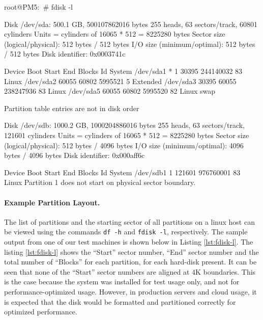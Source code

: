 \begin{snippet}
root@PM5:~# fdisk -l

Disk /dev/sda: 500.1 GB, 500107862016 bytes
255 heads, 63 sectors/track, 60801 cylinders
Units = cylinders of 16065 * 512 = 8225280 bytes
Sector size (logical/physical): 512 bytes / 512 bytes
I/O size (minimum/optimal): 512 bytes / 512 bytes
Disk identifier: 0x0003741c

   Device Boot      Start         End      Blocks   Id  System
/dev/sda1   *           1       30395   244140032   83  Linux
/dev/sda2           60055       60802     5995521    5  Extended
/dev/sda3           30395       60055   238247936   83  Linux
/dev/sda5           60055       60802     5995520   82  Linux swap

Partition table entries are not in disk order

Disk /dev/sdb: 1000.2 GB, 1000204886016 bytes
255 heads, 63 sectors/track, 121601 cylinders
Units = cylinders of 16065 * 512 = 8225280 bytes
Sector size (logical/physical): 512 bytes / 4096 bytes
I/O size (minimum/optimal): 4096 bytes / 4096 bytes
Disk identifier: 0x000aff6c

   Device Boot      Start         End      Blocks   Id  System
/dev/sdb1               1      121601   976760001   83  Linux
Partition 1 does not start on physical sector boundary.
\end{snippet}

\paragraph{Example Partition Layout.} 
The list of partitions and the starting sector of all 
partitions on a linux host can be viewed using the commands 
\texttt{df -h} and \texttt{fdisk -l}, respectively. 
The sample output from one of our test machines is shown below in 
Listing \ref{lst:fdisk-l}.
The listing \ref{lst:fdisk-l} shows the ``Start'' sector number, 
``End'' sector number and the total number of ``Blocks'' for each partition,
for each hard-disk present.
It can be seen that none of the ``Start'' sector numbers are aligned at
4K boundaries. This is the case because the system was installed for
test usage only, and not for performance-optimized usage. 
However, in
production servers and cloud usage, it is expected that the disk would
be formatted and partitioned correctly for optimized performance.

